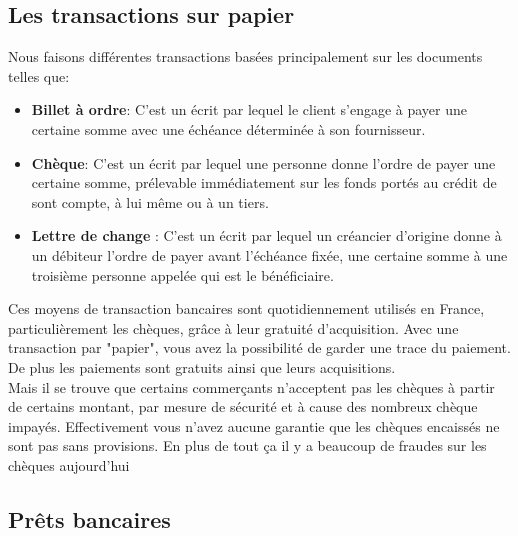 \documentclass[12pt]{report}
\begin{document}
    \subsection{Les transactions sur papier}
\hspace{1cm} Nous faisons différentes transactions basées principalement sur les documents telles que:

\begin{itemize}
    
    \item \textbf{Billet à ordre}: C'est un écrit par lequel le client s'engage à payer une certaine somme avec une échéance déterminée à son fournisseur.
    
    \item \textbf{Chèque}: C'est un écrit par lequel une personne donne l'ordre de payer une certaine somme, prélevable immédiatement sur les fonds portés au crédit de sont compte, à lui même ou à un tiers.
    
    \item \textbf{Lettre de change }: C'est un écrit par lequel un créancier d'origine donne à un débiteur l'ordre de payer avant l'échéance fixée, une certaine somme à une troisième personne appelée qui est le bénéficiaire.

\end{itemize}
    
\hspace{1cm} Ces moyens de transaction bancaires sont quotidiennement utilisés en France, particulièrement les chèques, grâce à leur gratuité d'acquisition. Avec une transaction par "papier", vous avez la possibilité de garder une trace du paiement.  De plus les paiements sont gratuits ainsi que leurs acquisitions.\\

\hspace{1cm} Mais il se trouve que certains commerçants n'acceptent pas les chèques à partir de certains montant, par mesure de sécurité et à cause  des nombreux chèque impayés. Effectivement vous n'avez aucune garantie que les chèques encaissés ne sont pas sans provisions. En plus de tout ça il y a beaucoup de fraudes sur les chèques aujourd'hui \\

    \subsection{Prêts bancaires}
    
\end{document}
